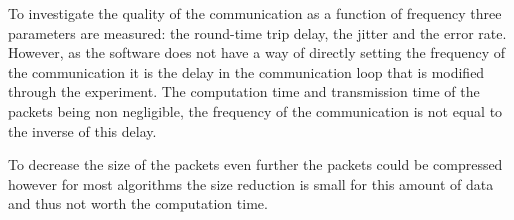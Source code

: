 To investigate the quality of the communication as a function of frequency three parameters are measured: the round-time trip delay, the jitter and the error rate. However, as the software does not have a way of directly setting the frequency of the communication it is the delay in the communication loop that is modified through the experiment. The computation time and transmission time of the packets being non negligible, the frequency of the communication is not equal to the inverse of this delay.
 
To decrease the size of the packets even further the packets could be compressed however for most algorithms the size reduction is small for this amount of data and thus not worth the computation time.